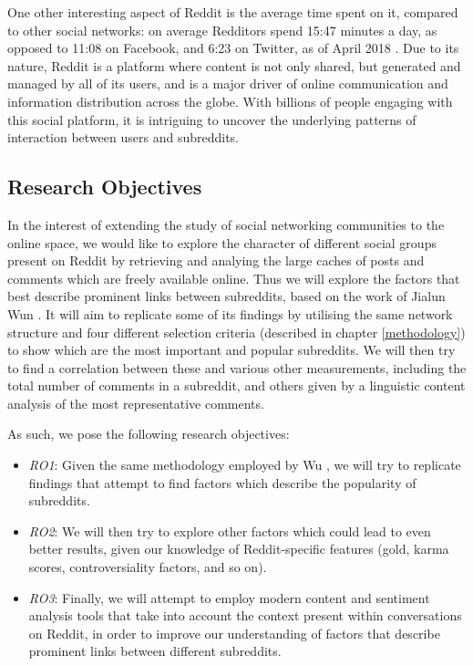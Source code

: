 \documentclass[bsc,frontabs,twoside,singlespacing,parskip,deptreport]{infthesis}
\begin{document}
One other interesting aspect of Reddit is the average time spent on it, compared to other social networks: on average Redditors spend 15:47 minutes a day, as opposed to 11:08 on Facebook, and 6:23 on Twitter, as of April 2018 \cite{alexa}. Due to its nature, Reddit is a platform where content is not only shared, but generated and managed by all of its users, and is a major driver of online communication and information distribution across the globe. With billions of people engaging with this social platform, it is intriguing to uncover the underlying patterns of interaction between users and subreddits.

\subsection{Research Objectives}
In the interest of extending the study of social networking communities to the online space, we would like to explore the character of different social groups present on Reddit by retrieving and analying the large caches of posts and comments which are freely available online. Thus we will explore the factors that best describe prominent links between subreddits, based on the work of Jialun Wun \cite{masters}. It will aim to replicate some of its findings by utilising the same network structure and four different selection criteria (described in chapter \ref{methodology}) to show which are the most important and popular subreddits. We will then try to find a correlation between these and various other measurements, including the total number of comments in a subreddit, and others given by a linguistic content analysis of the most representative comments.

As such, we pose the following research objectives:

\begin{itemize}
	\item \textit{RO1}: Given the same methodology employed by Wu \cite{masters}, we will try to replicate findings that attempt to find factors which describe the popularity of subreddits.
	\item \textit{RO2}: We will then try to explore other factors which could lead to even better results, given our knowledge of Reddit-specific features (gold, karma scores, controversiality factors, and so on).
	\item \textit{RO3}: Finally, we will attempt to employ modern content and sentiment analysis tools that take into account the context present within conversations on Reddit, in order to improve our understanding of factors that describe prominent links between different subreddits.
\end{itemize}
\end{document}
